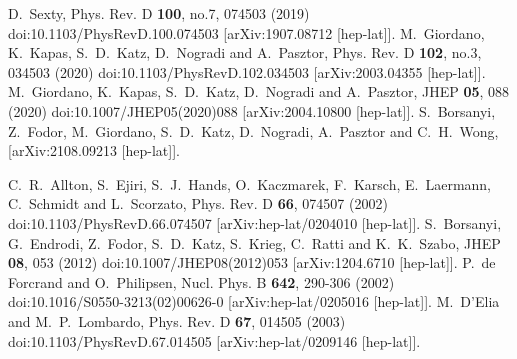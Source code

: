 \documentclass[a4paper,11pt]{article}
\begin{document}
\begin{thebibliography}{}
D.~Sexty,
Phys. Rev. D \textbf{100}, no.7, 074503 (2019)
doi:10.1103/PhysRevD.100.074503
[arXiv:1907.08712 [hep-lat]].
M.~Giordano, K.~Kapas, S.~D.~Katz, D.~Nogradi and A.~Pasztor,
Phys. Rev. D \textbf{102}, no.3, 034503 (2020)
doi:10.1103/PhysRevD.102.034503
[arXiv:2003.04355 [hep-lat]].
M.~Giordano, K.~Kapas, S.~D.~Katz, D.~Nogradi and A.~Pasztor,
JHEP \textbf{05}, 088 (2020)
doi:10.1007/JHEP05(2020)088
[arXiv:2004.10800 [hep-lat]].
S.~Borsanyi, Z.~Fodor, M.~Giordano, S.~D.~Katz, D.~Nogradi, A.~Pasztor and C.~H.~Wong,
[arXiv:2108.09213 [hep-lat]].

C.~R.~Allton, S.~Ejiri, S.~J.~Hands, O.~Kaczmarek, F.~Karsch, E.~Laermann, C.~Schmidt and L.~Scorzato,
Phys. Rev. D \textbf{66}, 074507 (2002)
doi:10.1103/PhysRevD.66.074507
[arXiv:hep-lat/0204010 [hep-lat]].
S.~Borsanyi, G.~Endrodi, Z.~Fodor, S.~D.~Katz, S.~Krieg, C.~Ratti and K.~K.~Szabo,
JHEP \textbf{08}, 053 (2012)
doi:10.1007/JHEP08(2012)053
[arXiv:1204.6710 [hep-lat]].
P.~de Forcrand and O.~Philipsen,
Nucl. Phys. B \textbf{642}, 290-306 (2002)
doi:10.1016/S0550-3213(02)00626-0
[arXiv:hep-lat/0205016 [hep-lat]].
M.~D'Elia and M.~P.~Lombardo,
Phys. Rev. D \textbf{67}, 014505 (2003)
doi:10.1103/PhysRevD.67.014505
[arXiv:hep-lat/0209146 [hep-lat]].




\end{thebibliography}
\end{document}

